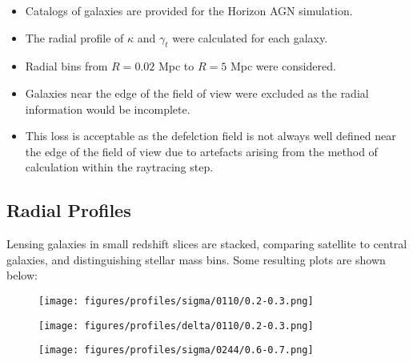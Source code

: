 \documentclass{beamer}
\begin{document}
  \begin{frame}
    \begin{itemize}
      \item Catalogs of galaxies are provided for the Horizon AGN simulation.
      \item The radial profile of $\kappa$ and $\gamma_t$ were calculated for each galaxy.
      \item Radial bins from $R = 0.02$ Mpc to $R = 5$ Mpc were considered.
      \item Galaxies near the edge of the field of view were excluded as the radial information would be incomplete.
      \item This loss is acceptable as the defelction field is not always well defined near the edge of the field of view due to artefacts arising from the method of calculation within the raytracing step.
    \end{itemize}
  \end{frame}

  \subsection{Radial Profiles}

  \begin{frame}
    Lensing galaxies in small redshift slices are stacked, comparing satellite to central galaxies, and distinguishing stellar mass bins. Some resulting plots are shown below:
  \end{frame}

  \begin{frame}
    \begin{figure}[H]
      \centering
      \texttt{[image: figures/profiles/sigma/0110/0.2-0.3.png]}
    \end{figure}
  \end{frame}

  \begin{frame}
    \begin{figure}[H]
      \centering
      \texttt{[image: figures/profiles/delta/0110/0.2-0.3.png]}
    \end{figure}
  \end{frame}

  \begin{frame}
    \begin{figure}[H]
      \centering
      \texttt{[image: figures/profiles/sigma/0244/0.6-0.7.png]}
    \end{figure}
  \end{frame}
\end{document}
